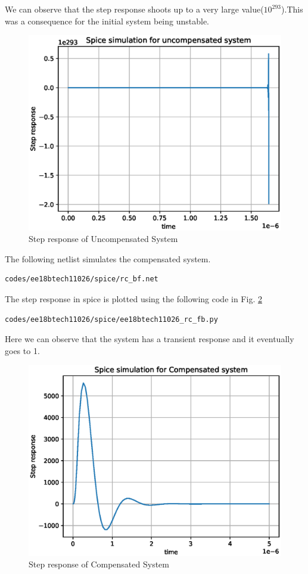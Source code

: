 \begin{enumerate}[label=\arabic*.,ref=\theenumi]
We can observe that the step response shoots up to a very large value($10^{293}$).This was a consequence for the initial system being unstable.
\begin{figure}[!h]
    \centering
    \includegraphics[width=\columnwidth]{./figs/ee18btech11026/ee18btech11026_spice_result_buffer.eps}
    \caption{Step response of Uncompensated System}
    \label{fig:ee18btech11026_buffer}
\end{figure}

The following netlist simulates the compensated system.
   \begin{lstlisting}
codes/ee18btech11026/spice/rc_bf.net
\end{lstlisting}
 The step response in spice is plotted using the following code in Fig. \ref{fig:ee18btech11026_rc_fb}
 \begin{lstlisting}
codes/ee18btech11026/spice/ee18btech11026_rc_fb.py
\end{lstlisting}
Here we can observe that the system has a transient response and it eventually  goes to 1.
\begin{figure}[!h]
    \centering
    \includegraphics[width=\columnwidth]{./figs/ee18btech11026/ee18btech11026_spice_result_rc_bf.eps}
    \caption{Step response of Compensated System}
    \label{fig:ee18btech11026_rc_fb}
\end{figure}



\end{enumerate}
